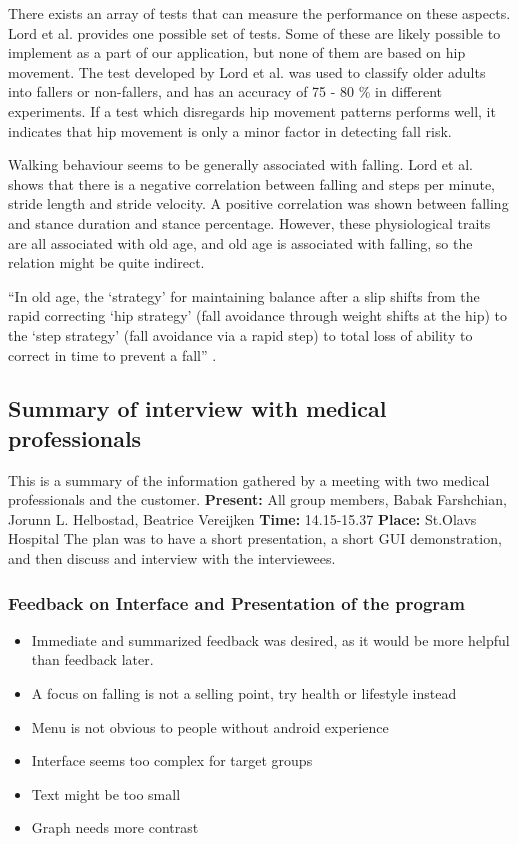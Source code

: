 There exists an array of tests that can measure the performance on these aspects. Lord et al. \cite{LMTassessPrev} provides one possible set of tests. Some of these are likely possible to implement as a part of our application, but none of them are based on hip movement.
	The test developed by Lord et al. \cite{LMTassessPrev} was used to classify older adults into fallers or non-fallers, and has an accuracy of 75 - 80 \% in different experiments. If a test which disregards hip movement patterns performs well, it indicates that hip movement is only a minor factor in detecting fall risk.

Walking behaviour seems to be generally associated with falling. Lord et al. \cite{LLKgaitPatterns} shows that there is a negative correlation between falling and steps per minute, stride length and stride velocity. A positive correlation was shown between falling and stance duration and stance percentage. However, these physiological traits are all associated with old age, and old age is associated with falling, so the relation might be quite indirect.

“In old age, the ‘strategy’ for maintaining balance after a slip shifts from the rapid correcting ‘hip strategy’ (fall avoidance through weight shifts at the hip) to the ‘step strategy’ (fall avoidance via a rapid step) to total loss of ability to correct in time to prevent a fall” \cite{fallsRubenstein}.

\subsection{Summary of interview with medical professionals}
This is a summary of the information gathered by a meeting with two medical professionals and the customer.
\textbf{Present:} All group members, Babak Farshchian, Jorunn L. Helbostad, Beatrice Vereijken 
\textbf{Time:} 14.15-15.37
\textbf{Place:} St.Olavs Hospital
The plan was to have a short presentation, a short GUI demonstration, and then discuss and interview with the interviewees. \\
\subsubsection*{Feedback on Interface and Presentation of the program}
\begin{itemize}
\item Immediate and summarized feedback was desired, as it would be more helpful than feedback later.
\item A focus on falling is not a selling point, try health or lifestyle instead
\item Menu is not obvious to people without android experience
\item Interface seems too complex for target groups
\item Text might be too small
\item Graph needs more contrast 

\end{itemize}

